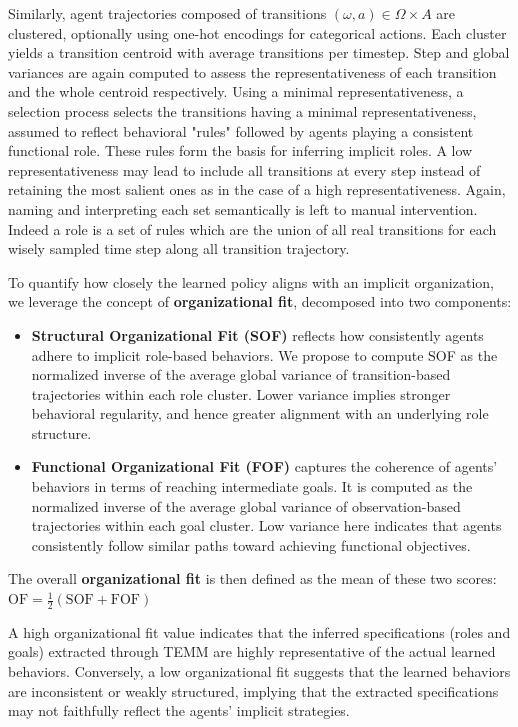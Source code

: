 Similarly, agent trajectories composed of transitions $(\omega, a) \in \Omega \times A$ are clustered, optionally using one-hot encodings for categorical actions. Each cluster yields a transition centroid with average transitions per timestep. Step and global variances are again computed to assess the representativeness of each transition and the whole centroid respectively.
%
Using a minimal representativeness, a selection process selects the transitions having a minimal representativeness, assumed to reflect behavioral "rules" followed by agents playing a consistent functional role. These rules form the basis for inferring implicit roles. A low representativeness may lead to include all transitions at every step instead of retaining the most salient ones as in the case of a high representativeness. Again, naming and interpreting each set semantically is left to manual intervention. Indeed a role is a set of rules which are the union of all real transitions for each wisely sampled time step along all transition trajectory.

To quantify how closely the learned policy aligns with an implicit organization, we leverage the concept of \textbf{organizational fit}, decomposed into two components:
%
\begin{itemize}
    \item \textbf{Structural Organizational Fit (SOF)} reflects how consistently agents adhere to implicit role-based behaviors. We propose to compute SOF as the normalized inverse of the average global variance of transition-based trajectories within each role cluster. Lower variance implies stronger behavioral regularity, and hence greater alignment with an underlying role structure.
    \item \textbf{Functional Organizational Fit (FOF)} captures the coherence of agents' behaviors in terms of reaching intermediate goals. It is computed as the normalized inverse of the average global variance of observation-based trajectories within each goal cluster. Low variance here indicates that agents consistently follow similar paths toward achieving functional objectives.
\end{itemize}
%
The overall \textbf{organizational fit} is then defined as the mean of these two scores: $\text{OF} = \frac{1}{2} \left( \text{SOF} + \text{FOF} \right)$

A high organizational fit value indicates that the inferred specifications (roles and goals) extracted through TEMM are highly representative of the actual learned behaviors. Conversely, a low organizational fit suggests that the learned behaviors are inconsistent or weakly structured, implying that the extracted specifications may not faithfully reflect the agents' implicit strategies.

